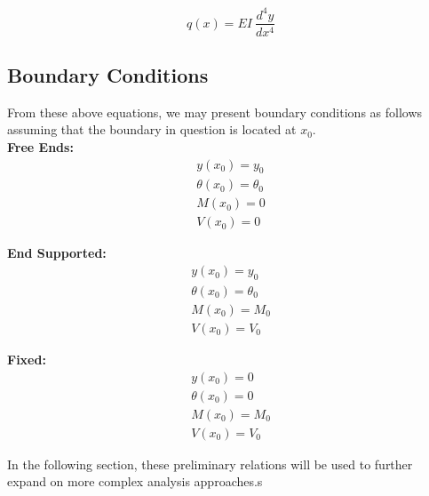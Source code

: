 \begin{equation}
	\label{eq:loadintens}
	q(x) = EI\ \frac{d^4y}{dx^4}
\end{equation}

\subsection{Boundary Conditions}

From these above equations, we may present boundary conditions as follows assuming that the boundary in question is located at $x_0$.\\

\textbf{Free Ends:}\\
\begin{equation}
	\label{eq:freeBC}
	\begin{aligned}
	y(x_0) = y_0 \\
	\theta(x_0)= \theta_0\\
	M(x_0) = 0\\
	V(x_0) = 0 
	\end{aligned}
\end{equation}

\textbf{End Supported:}\\
\begin{equation}
	\label{eq:freeBC}
	\begin{aligned}
	y(x_0)=y_0 \\
	\theta(x_0)=\theta_0\\
	M(x_0)=M_0\\
	V(x_0) =V_0 
	\end{aligned}
\end{equation}

\textbf{Fixed:}\\
\begin{equation}
	\label{eq:freeBC}
	\begin{aligned}
	y(x_0)=0 \\
	\theta(x_0)=0\\
	M(x_0)=M_0\\
	V(x_0) =V_0 
	\end{aligned}
\end{equation}

In the following section, these preliminary relations will be used to further expand on more complex analysis approaches.s

